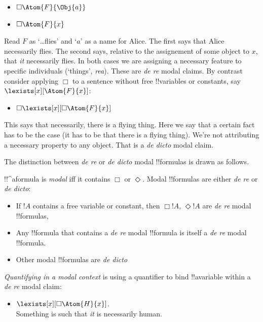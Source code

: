 \documentclass[../../../include/open-logic-section]{subfiles}
\begin{document}
\begin{itemize}
    \item $\Box\Atom{F}{\Obj{a}}$
    \item $\Box\Atom{F}{x}$
\end{itemize}

Read $F$ as `\dots flies' and `$a$' as a name for Alice. The first
says that Alice necessarily flies. The second says, relative to the
assignement of some object to $x$, that \emph{it} necessarily flies.
In both cases we are assigning a necessary feature to specific
individuals (`things', \emph{rea}). These are \emph{de re} modal
claims. By contrast consider applying $\Box$ to a sentence without 
free !!{variable}s or constants, say $\lexists[x][\Atom{F}{x}]$:

\begin{itemize}
    \item $\Box\lexists[x][\Box\Atom{F}{x}]$
\end{itemize}

This says that necessarily, there is a flying thing. Here we say that 
a certain fact has to be the case (it has to be that there is a flying
thing). We're not attributing a necessary property to any object. 
That is a \emph{de dicto} modal claim.

The distinction between \emph{de re} or \emph{de dicto} modal !!{formula}s
is drawn as follows.

\begin{defn}[De re vs de dicto]
!!^a{formula} is \emph{modal} iff it contains $\Box$ or 
$\Diamond$. Modal !!{formula}s are either \emph{de re} or \emph{de dicto}:
\begin{itemize}
\item If $!A$ contains a free variable or constant, then $\Box!A$, $\Diamond!A$
are \emph{de re} modal !!{formula}s,
\item Any !!{formula} that contains a \emph{de re} modal !!{formula} is
itself a \emph{de re} modal !!{formula}.
\item Other modal !!{formula}s are \emph{de dicto}
\end{itemize}

\end{defn}

\emph{Quantifying in a modal context} is using a quantifier to bind
!!a{variable} within a \emph{de re} modal claim: 

\begin{itemize}
\item $\lexists[x][\Box\Atom{H}{x}]$.\\
Something is such that \emph{it} is necessarily human.
\end{itemize}
\end{document}
